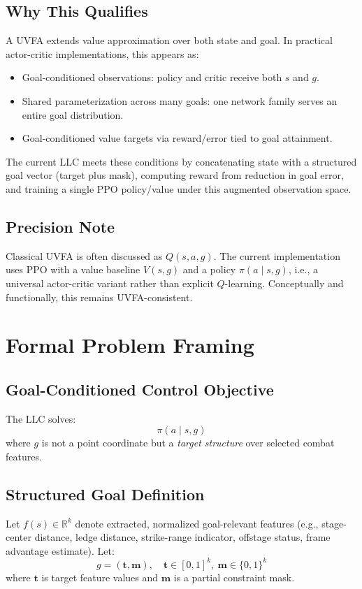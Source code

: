 \documentclass[11pt,a4paper]{article}
\begin{document}
\subsection{Why This Qualifies}
A UVFA extends value approximation over both state and goal. In practical actor-critic implementations, this appears as:
\begin{itemize}[leftmargin=1.5em]
    \item Goal-conditioned observations: policy and critic receive both $s$ and $g$.
    \item Shared parameterization across many goals: one network family serves an entire goal distribution.
    \item Goal-conditioned value targets via reward/error tied to goal attainment.
\end{itemize}

The current LLC meets these conditions by concatenating state with a structured goal vector (target plus mask), computing reward from reduction in goal error, and training a single PPO policy/value under this augmented observation space.

\subsection{Precision Note}
Classical UVFA is often discussed as $Q(s,a,g)$. The current implementation uses PPO with a value baseline $V(s,g)$ and a policy $\pi(a\mid s,g)$, i.e., a universal actor-critic variant rather than explicit $Q$-learning. Conceptually and functionally, this remains UVFA-consistent.

\section{Formal Problem Framing}
\subsection{Goal-Conditioned Control Objective}
The LLC solves:
\[
\pi(a\mid s,g)
\]
where $g$ is not a point coordinate but a \emph{target structure} over selected combat features.

\subsection{Structured Goal Definition}
Let $f(s)\in\mathbb{R}^{k}$ denote extracted, normalized goal-relevant features (e.g., stage-center distance, ledge distance, strike-range indicator, offstage status, frame advantage estimate). Let:
\[
g = (\mathbf{t},\mathbf{m}), \quad \mathbf{t}\in [0,1]^k,\ \mathbf{m}\in\{0,1\}^k
\]
where $\mathbf{t}$ is target feature values and $\mathbf{m}$ is a partial constraint mask.
\end{document}
